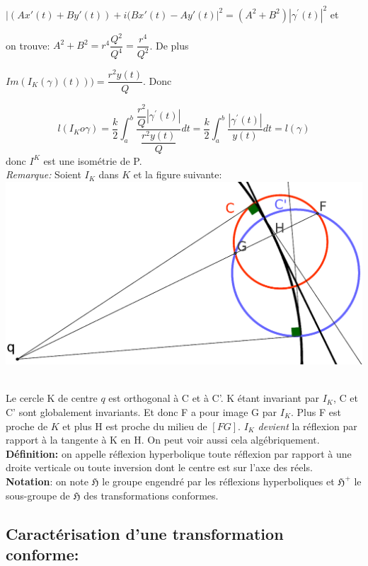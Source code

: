 \documentclass[a4paper, 12pt, twoside]{book}
\begin{document}
 $|(Ax'(t)+By'(t))+i(Bx'(t)-Ay'(t)|^{2}=(A^{2}+B^{2})|\gamma^{'}(t)|^{2}$ et\
 
 on trouve: $A^{2}+B^{2}=r^{4}\dfrac{Q^{2}}{Q^{4}}=\dfrac{r^{4}}{Q^{2}}$. De plus\
 
 $Im(I_{K}(\gamma)(t)))=\dfrac{r^{2}y(t)}{Q}$. Donc 
 
 $$l(I_{K}o\gamma)= \dfrac{k}{2}\int_{a}^{b} \dfrac{\dfrac{r^{2}}{Q}|\gamma^{'}(t)|}{\dfrac{r^{2}y(t)}{Q}} dt=\dfrac{k}{2}\int_{a}^{b} \dfrac{|\gamma^{'}(t)|}{y(t)} dt=l(\gamma)$$ donc $I^{K}$ est une isométrie de P.\\
 
 
 \textit{Remarque:}  Soient $I_{K}$ dans $K$ et la figure suivante:\\
 
 \includegraphics[scale=0.5]{figures/hyper3.eps} \
 
 Le cercle K de centre $q$ est orthogonal à C et à C'. K étant invariant par $I_{K}$, C et C' sont globalement invariants. Et donc F a pour image G par $I_{K}$. Plus F est proche de $K$ et plus H est proche du milieu de $[FG]$. $I_{K}$  \textit{devient} la réflexion par rapport à la tangente à K en H. On peut voir aussi cela algébriquement.\\
 
 \textbf{Définition:} on appelle réflexion hyperbolique toute réflexion par rapport à une droite verticale ou toute inversion dont le centre est sur l'axe des réels.\\
 
 \textbf{Notation}: on note \textbf{$\mathfrak{H}$} le groupe engendré par les réflexions hyperboliques et \textbf{$\mathfrak{H}^{+}$} le sous-groupe de \textbf{$\mathfrak{H}$} des transformations conformes.\
 
 \subsection{Caractérisation d'une transformation conforme:}
 
\end{document}

